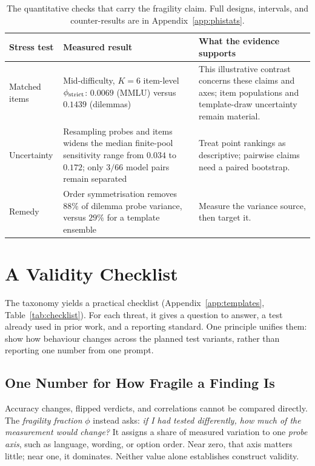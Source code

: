 \documentclass[11pt]{article}
\begin{document}
\begin{table}[!t]
\centering
\tiny
\setlength{\tabcolsep}{3pt}
\begin{tabular}{@{}p{2.8cm}p{6.1cm}p{6.0cm}@{}}
\toprule
\textbf{Stress test} & \textbf{Measured result} & \textbf{What the evidence supports} \\
\midrule
Matched items & Mid-difficulty, $K=6$ item-level $\phi_{\rm strict}$: $0.0069$
(MMLU) versus $0.1439$ (dilemmas) & This illustrative contrast concerns these
claims and axes; item populations and template-draw uncertainty remain material. \\
Uncertainty & Resampling probes and items widens the median finite-pool sensitivity range
from $0.034$ to $0.172$; only $3/66$ model pairs remain separated & Treat point
rankings as descriptive; pairwise claims need a paired bootstrap. \\
Remedy & Order symmetrisation removes $88\%$ of dilemma probe variance, versus
$29\%$ for a template ensemble & Measure the variance source, then target it. \\
\bottomrule
\end{tabular}
\caption{The quantitative checks that carry the fragility claim. Full designs,
intervals, and counter-results are in Appendix~\ref{app:phistats}.}
\label{tab:phivalidation}
\end{table}

\section{A Validity Checklist}
\label{sec:checklist}

The taxonomy yields a practical checklist (Appendix~\ref{app:templates},
Table~\ref{tab:checklist}). For each threat, it gives a question to answer, a
test already used in prior work, and a reporting standard. One principle unifies
them: show how behaviour changes across the planned test variants, rather than
reporting one number from one prompt.

\subsection{One Number for How Fragile a Finding Is}

Accuracy changes, flipped verdicts, and correlations cannot be compared
directly. The \emph{fragility fraction} $\phi$ instead asks: \emph{if I had
tested differently, how much of the measurement would change?} It assigns a
share of measured variation to one \emph{probe axis}, such as language, wording,
or option order. Near zero, that axis matters little; near one, it dominates.
Neither value alone establishes construct validity.
\end{document}
